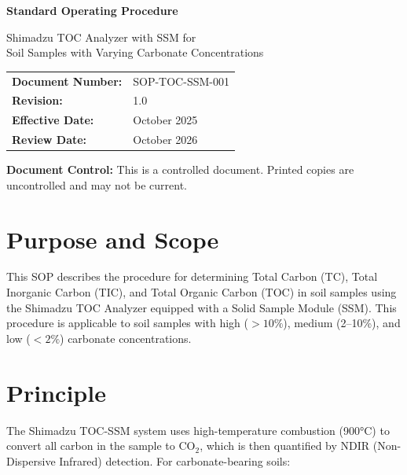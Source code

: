 \documentclass[11pt,a4paper]{article}\usepackage[]{graphicx}\usepackage[]{xcolor}
\begin{document}
\begin{titlepage}
    \centering
    \vspace*{2cm}
    
    {\Huge\bfseries Standard Operating Procedure\par}
    \vspace{1cm}
    {\Large Shimadzu TOC Analyzer with SSM for\\Soil Samples with Varying Carbonate Concentrations\par}
    \vspace{2cm}
    
    \begin{tabular}{ll}
        \toprule
        \textbf{Document Number:} & SOP-TOC-SSM-001 \\
        \textbf{Revision:} & 1.0 \\
        \textbf{Effective Date:} & October 2025 \\
        \textbf{Review Date:} & October 2026 \\
        \bottomrule
    \end{tabular}
    
    \vfill
    
    {\large \textbf{Document Control:} This is a controlled document. Printed copies are uncontrolled and may not be current.\par}
    
\end{titlepage}

\tableofcontents
\newpage

\section{Purpose and Scope}

This SOP describes the procedure for determining Total Carbon (TC), Total Inorganic Carbon (TIC), and Total Organic Carbon (TOC) in soil samples using the Shimadzu TOC Analyzer equipped with a Solid Sample Module (SSM). This procedure is applicable to soil samples with high ($>10\%$), medium (2--10\%), and low ($<2\%$) carbonate concentrations.

\section{Principle}

The Shimadzu TOC-SSM system uses high-temperature combustion (900°C) to convert all carbon in the sample to CO$_2$, which is then quantified by NDIR (Non-Dispersive Infrared) detection. For carbonate-bearing soils:
\end{document}
